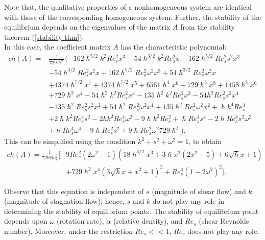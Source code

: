 \documentclass[pdflatex,sn-mathphys]{sn-jnl}%
\theoremstyle{thmstyleone}%
\theoremstyle{thmstyletwo}%
\theoremstyle{thmstylethree}%
\begin{document}
Note that, the qualitative properties of a nonhomogeneous system are identical with those of the corresponding homogeneous system.
Further, the stability of the equilibrium depends on the eigenvalues of the matrix $A$ from the stability theorem (\ref{stability thm}).\\
In this case, the coefficient matrix $A$ has the characteristic polynomial:
\begin{align*}
 ch(A) = & \frac{1}{729 \hslash^2}(-162 \hslash^{5/2} k^2 Re_{s}^2 x^3-54 \hslash^{3/2} k^2 Re_{s}^2 x -162 \hslash^{5/2} Re_{s}^2 s^2 x^3\\ &-54 \hslash^{3/2} Re_{s}^2 s^2 x+162 \hslash^{5/2} Re_{s}^2 \omega^2 x^3 +54 \hslash^{3/2} Re_{s}^2 \omega^2 x\\ &+4374 \hslash^{7/2} x^7+4374 \hslash^{7/2} x^5+6561 \hslash^4 x^6+729 \hslash^3 x^8+1458 \hslash^3 x^6\\ &+729 \hslash^3 x^4 -54 \hslash^2 k^2 Re_{s}^2 x^4-135 \hslash^2 k^2 Re_{s}^2 x^2-54 h^2 Re_{s}^2 s^2 x^4\\ &-135 \hslash^2 Re_{s}^2 s^2 x^2+54 \hslash^2 Re_{s}^2 \omega^2 x^4 +135 \hslash^2 Re_{s}^2 \omega^2 x^2+\hslash k^4 Re_{s}^4\\ &+2 \hslash k^2 Re_{s}^4 s^2-2 h k^2 Re_{s}^4 \omega^2-9 \hslash k^2 Re_{s}^2+ \hslash Re_{s}^4 s^4-2 \hslash Re_{s}^4 s^2 \omega^2 \\& +\hslash Re_{s}^4 \omega^4-9 \hslash Re_{s}^2 s^2+9 \hslash Re_{s}^2 \omega^2{729 \hslash^3}).
\end{align*} 
This can be simplified using the condition $k^2+s^2+\omega^2=1$, to obtain
 \begin{align*}
  	ch(A) =  \frac{1}{729Re_{s}^2} [ & 9Re_{s}^2\left(2 \omega^2-1\right) \left(18 \hslash^{3/2} x^3+3 \hslash x^2 \left(2 x^2+5\right)+6 \sqrt{\hslash} x+1\right)\\& +729 \hslash^2 x^4 \left(3 \sqrt{\hslash} x+x^2+1\right)^2 +Re_{s}^4 \left(1-2 \omega^2 \right)^2]. 
  \end{align*}
 
Observe that this equation is independent of $s$ (magnitude of shear flow) and $k$ (magnitude of stagnation flow); hence, $s$ and $k$ do not play any role in determining the stability of equilibrium points. The stability of equilibrium point depends upon $\omega$ (rotation rate), $\alpha$ (relative density), and $Re_{s}$ (shear Reynolds number). 
Moreover, under the restriction $Re_{s}<<1$, $Re_{s}$ does not play any role. 
\end{document}
